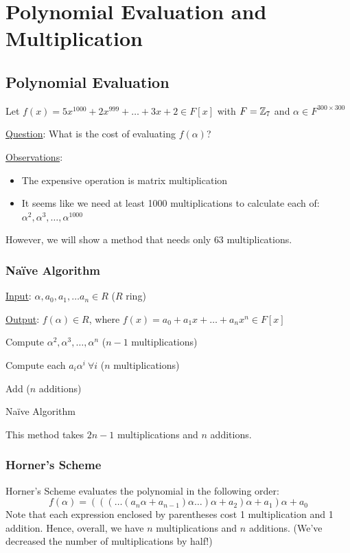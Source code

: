 \section{Polynomial Evaluation and Multiplication}

\subsection{Polynomial Evaluation}
\begin{example}
    Let $f(x) = 5x^{1000} + 2x^{999} + \ldots + 3x +2 \in F[x]$ with $F = \mathbb{Z}_7$ and $\alpha \in F^{300 \times 300}$

    \underline{Question}: What is the cost of evaluating $f(\alpha)$?

    \underline{Observations}:
    \begin{itemize}
        \item The expensive operation is matrix multiplication
        \item It seems like we need at least 1000 multiplications to calculate each of: $\alpha^2, \alpha^3, \ldots, \alpha^{1000}$
    \end{itemize}

    However, we will show a method that needs only $63$ multiplications.
\end{example}

\subsubsection{Naïve Algorithm}
\IncMargin{1em}
\begin{algorithm}[H]
    \underline{Input}: $\alpha, a_0, a_1, \ldots a_n \in R$ ($R$ ring)

    \underline{Output}: $f(\alpha) \in R$, where $f(x) = a_0 + a_1x + \ldots + a_nx^n \in F[x]$

    \BlankLine
    \nl Compute $\alpha^2, \alpha^3, \ldots, \alpha^n$ ($n - 1$ multiplications)

    \nl Compute each $a_i\alpha^i \ \forall i$ ($n$ multiplications)

    \nl Add ($n$ additions)
    \caption{Naïve Algorithm}
\end{algorithm}

This method takes $2n-1$ multiplications and $n$ additions.

\subsubsection{Horner's Scheme}
Horner's Scheme evaluates the polynomial in the following order:
\begin{equation*}
    f(\alpha) = (((\ldots(a_n\alpha + a_{n-1})\alpha\ldots)\alpha + a_2)\alpha + a_1)\alpha + a_0
\end{equation*}
Note that each expression enclosed by parentheses cost 1 multiplication and 1 addition.
Hence, overall, we have $n$ multiplications and $n$ additions.
(We've decreased the number of multiplications by half!)

